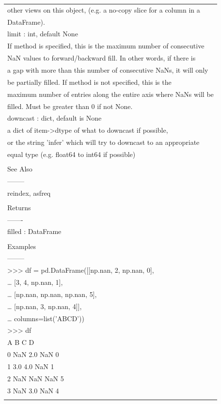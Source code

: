 \documentclass[11pt]{article}
\begin{document}
\begin{enumerate}
\begin{enumerate}
\begin{enumerate}
\begin{center}
\begin{tabular}{l}
other views on this object, (e.g. a no-copy slice for a column in a\\
DataFrame).\\
limit : int, default None\\
If method is specified, this is the maximum number of consecutive\\
NaN values to forward/backward fill. In other words, if there is\\
a gap with more than this number of consecutive NaNs, it will only\\
be partially filled. If method is not specified, this is the\\
maximum number of entries along the entire axis where NaNs will be\\
filled. Must be greater than 0 if not None.\\
downcast : dict, default is None\\
a dict of item->dtype of what to downcast if possible,\\
or the string 'infer' which will try to downcast to an appropriate\\
equal type (e.g. float64 to int64 if possible)\\
\\
See Also\\
--------\\
reindex, asfreq\\
\\
Returns\\
-------\\
filled : DataFrame\\
\\
Examples\\
--------\\
>>> df = pd.DataFrame([[np.nan, 2, np.nan, 0],\\
\ldots{}                    [3, 4, np.nan, 1],\\
\ldots{}                    [np.nan, np.nan, np.nan, 5],\\
\ldots{}                    [np.nan, 3, np.nan, 4]],\\
\ldots{}                    columns=list('ABCD'))\\
>>> df\\
A    B   C  D\\
0  NaN  2.0 NaN  0\\
1  3.0  4.0 NaN  1\\
2  NaN  NaN NaN  5\\
3  NaN  3.0 NaN  4\\
\\

\end{tabular}
\end{center}
\end{enumerate}
\end{enumerate}
\end{enumerate}
\end{document}
